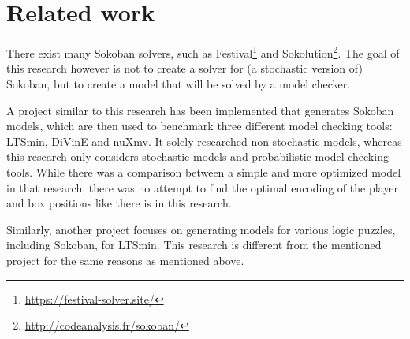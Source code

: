 \section{Related work}
There exist many Sokoban solvers, such as Festival\footnote{\url{https://festival-solver.site/}} and Sokolution\footnote{\url{http://codeanalysis.fr/sokoban/}}. The goal of this research however is not to create a solver for (a stochastic version of) Sokoban, but to create a model that will be solved by a model checker.

A project similar to this research has been implemented that generates Sokoban models, which are then used to benchmark three different model checking tools: LTSmin, DiVinE and nuXmv\cite{comparing_sokoban}. It solely researched non-stochastic models, whereas this research only considers stochastic models and probabilistic model checking tools. While there was a comparison between a simple and more optimized model in that research, there was no attempt to find the optimal encoding of the player and box positions like there is in this research.

Similarly, another project focuses on generating models for various logic puzzles, including Sokoban, for LTSmin\cite{ltsmin-puzzles}. This research is different from the mentioned project for the same reasons as mentioned above.
